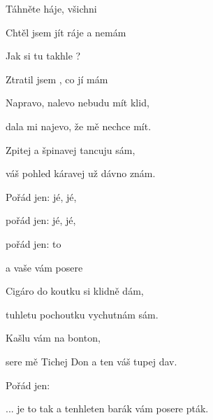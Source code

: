 

\zs
Táhněte  háje, všichni 

Chtěl jsem jít  ráje a nemám 

Jak si tu  takhle ?

Ztratil jsem , co jí mám 
\ks

\zs
Napravo, {nalevo} nebudu mít {klid,}

dala mi {najevo}, že mě nechce {mít.}

Zpitej a {špinavej} tancuju {sám,}

váš pohled {káravej} už dávno {znám.}
\ks

\zr
Pořád jen:   jé, jé,

pořád jen:    jé, jé,

pořád jen:   to 

a vaše  vám posere 
\kr

\zs
Cigáro do koutku si klidně dám,

tuhletu pochoutku vychutnám sám.

Kašlu vám na bonton, 

sere mě Tichej Don a ten váš tupej dav.
\ks

\zr  \kr

\zr
Pořád jen: 

... je to tak a tenhleten barák vám posere pták.
\kr

\kp





